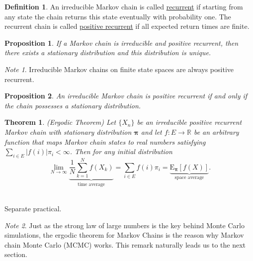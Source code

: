 \documentclass[11pt]{article}\usepackage[]{graphicx}\usepackage[]{color}
\numberwithin{algorithm}{section}
\newtheorem*{theorem}{Theorem}
\newtheorem*{prop}{Proposition}
\theoremstyle{remark}
\newtheorem*{mynote}{Note}
\theoremstyle{definition}
\newtheorem*{define}{Definition}
\newenvironment{example}[1]{\begin{trivlist}
\item[\hskip \labelsep {\bfseries Example}: \underline{#1}]\ \\}{\end{trivlist}}
\begin{document}
\begin{define}
  An irreducible Markov chain is called \underline{recurrent} if starting from any state the chain 
  returns this state eventually with probability one. The recurrent chain is called 
  \underline{positive recurrent} if all expected return times are finite.
\end{define}

\begin{prop}
  If a Markov chain is irreducible and positive recurrent, then there exists a stationary distribution and 
  this distribution is unique.
\end{prop}

\begin{mynote}
  Irreducible Markov chains on finite state spaces are always positive recurrent.
\end{mynote}

\begin{prop}
  An irreducible Markov chain is positive recurrent if and only if the chain possesses a stationary distribution.
\end{prop}

\begin{theorem}{(Ergodic Theorem)}
  Let $\{X_n\}$ be an irreducible positive recurrent Markov chain with stationary distribution 
  $\boldsymbol{\pi}$ and let $f: E \rightarrow \mathbb{R}$ be an arbitrary function that maps Markov chain
  states to real numbers satisfying $\sum_{i \in E} |f(i)| \pi_i < \infty$. Then for any initial distribution
  \begin{equation*}
    \lim_{N \rightarrow \infty}\underbrace{\frac{1}{N}\sum_{k=1}^N f(X_k)}_{\text{time average}} 
    = \sum_{i \in E} f(i) \pi_i = \underbrace{\text{E}_{\boldsymbol{\pi}}[f(X)]}_{\text{space average}}.
  \end{equation*}
\end{theorem}

\begin{example}{Ehrenfest model of diffusion (continued)}
Separate practical.
\end{example}

\begin{mynote}
  Just as the strong law of large numbers is the key behind Monte Carlo
  simulations, the ergodic theorem for Markov Chains is the reason why Markov chain Monte Carlo (MCMC) works.
  This remark naturally leads us to the next section.
\end{mynote}
\end{document}

